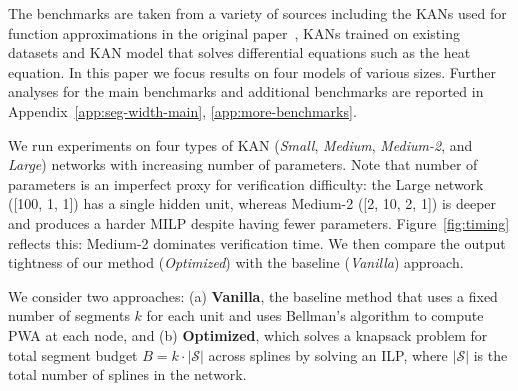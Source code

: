 The benchmarks are taken from a variety of sources including the KANs used for function approximations in the original paper~\cite{li2024kolmogorovarnold}, KANs trained on existing datasets and KAN model that solves differential equations such as the heat equation. 
In this paper we focus results on four models of various sizes. Further analyses for the main benchmarks and additional benchmarks are reported in Appendix~\ref{app:seg-width-main}, \ref{app:more-benchmarks}.

We run experiments on four types of KAN (\emph{Small}, \emph{Medium}, \emph{Medium-2}, and \emph{Large}) networks with increasing number of parameters. Note that number of parameters is an imperfect proxy for verification difficulty: the Large network ([100, 1, 1]) has a single hidden unit, whereas Medium-2 ([2, 10, 2, 1]) is deeper and produces a harder MILP despite having fewer parameters. Figure~\ref{fig:timing} reflects this: Medium-2 dominates verification time. We then compare the output tightness of our method (\emph{Optimized}) with the baseline (\emph{Vanilla}) approach. 

We consider two approaches: (a) \textbf{Vanilla}, the baseline method that uses a fixed number of segments $k$ for each unit and uses Bellman's algorithm to compute PWA at each node, and (b) \textbf{Optimized}, which solves a knapsack problem for total segment budget $B = k \cdot |\mathcal{S}|$ across splines by solving an ILP, where $|\mathcal{S}|$ is the total number of splines in the network.

